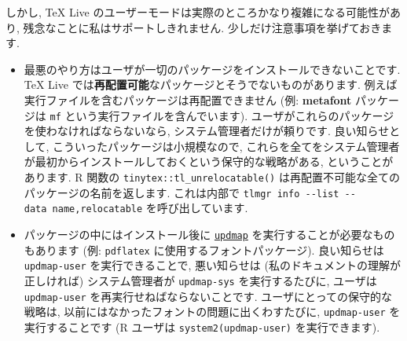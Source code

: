 \documentclass[
  xelatex,ja=standard,jafont=noto]{bxjsreport}
\begin{document}
しかし, TeX Live
のユーザーモードは実際のところかなり複雑になる可能性があり,
残念なことに私はサポートしきれません. 少しだけ注意事項を挙げておきます.

\begin{itemize}
\item
  最悪のやり方はユーザが一切のパッケージをインストールできないことです.
  TeX Live
  では\textbf{再配置可能}なパッケージとそうでないものがあります.
  例えば実行ファイルを含むパッケージは再配置できません (例:
  \textbf{metafont} パッケージは \texttt{mf}
  という実行ファイルを含んでいます).
  ユーザがこれらのパッケージを使わなければならないなら,
  システム管理者だけが頼りです. 良い知らせとして,
  こういったパッケージは小規模なので,
  これらを全てをシステム管理者が最初からインストールしておくという保守的な戦略がある,
  ということがあります. R 関数の \texttt{tinytex::tl\_unrelocatable()}
  は再配置不可能な全てのパッケージの名前を返します. これは内部で
  \texttt{tlmgr\ info\ -\/-list\ -\/-data\ name,relocatable}
  を呼び出しています.
\item
  パッケージの中にはインストール後に
  \href{https://www.tug.org/texlive/doc/updmap.html}{\texttt{updmap}}
  を実行することが必要なものもあります (例: \texttt{pdflatex}
  に使用するフォントパッケージ). 良い知らせは \texttt{updmap-user}
  を実行できることで, 悪い知らせは (私のドキュメントの理解が正しければ)
  システム管理者が \texttt{updmap-sys} を実行するたびに, ユーザは
  \texttt{updmap-user} を再実行せねばならないことです.
  ユーザにとっての保守的な戦略は,
  以前にはなかったフォントの問題に出くわすたびに, \texttt{updmap-user}
  を実行することです (R ユーザは
  \texttt{system2(\textquotesingle{}updmap-user\textquotesingle{})}
  を実行できます).
\end{itemize}
\end{document}
